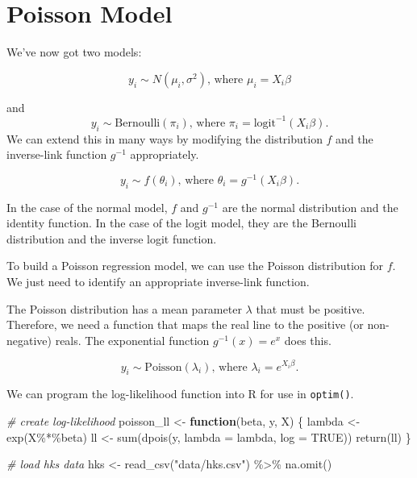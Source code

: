 \documentclass[
]{book}
\newenvironment{Shaded}{\begin{snugshade}}{\end{snugshade}}
\newcommand{\AttributeTok}[1]{\textcolor[rgb]{0.77,0.63,0.00}{#1}}
\newcommand{\CommentTok}[1]{\textcolor[rgb]{0.56,0.35,0.01}{\textit{#1}}}
\newcommand{\ConstantTok}[1]{\textcolor[rgb]{0.00,0.00,0.00}{#1}}
\newcommand{\ControlFlowTok}[1]{\textcolor[rgb]{0.13,0.29,0.53}{\textbf{#1}}}
\newcommand{\FunctionTok}[1]{\textcolor[rgb]{0.00,0.00,0.00}{#1}}
\newcommand{\NormalTok}[1]{#1}
\newcommand{\OtherTok}[1]{\textcolor[rgb]{0.56,0.35,0.01}{#1}}
\newcommand{\SpecialCharTok}[1]{\textcolor[rgb]{0.00,0.00,0.00}{#1}}
\newcommand{\StringTok}[1]{\textcolor[rgb]{0.31,0.60,0.02}{#1}}
\begin{document}
\hypertarget{poisson-model}{%
\section{Poisson Model}\label{poisson-model}}

We've now got two models:

\[
y_i \sim N(\mu_i, \sigma^2)\text{, where } \mu_i = X_i\beta
\]

and
\[
y_i \sim \text{Bernoulli}(\pi_i)\text{, where } \pi_i = \text{logit}^{-1}(X_i\beta).
\]
We can extend this in many ways by modifying the distribution \(f\) and the inverse-link function \(g^{-1}\) appropriately.

\[
y_i \sim f(\theta_i)\text{, where } \theta_i = g^{-1}(X_i\beta).
\]

In the case of the normal model, \(f\) and \(g^{-1}\) are the normal distribution and the identity function. In the case of the logit model, they are the Bernoulli distribution and the inverse logit function.

To build a Poisson regression model, we can use the Poisson distribution for \(f\). We just need to identify an appropriate inverse-link function.

The Poisson distribution has a mean parameter \(\lambda\) that must be positive. Therefore, we need a function that maps the real line to the positive (or non-negative) reals. The exponential function \(g^{-1}(x) = e^x\) does this.

\[
y_i \sim \text{Poisson}(\lambda_i)\text{, where } \lambda_i = e^{X_i\beta}.
\]

We can program the log-likelihood function into R for use in \texttt{optim()}.

\begin{Shaded}
\begin{Highlighting}[]
\CommentTok{\# create log{-}likelihood}
\NormalTok{poisson\_ll }\OtherTok{\textless{}{-}} \ControlFlowTok{function}\NormalTok{(beta, y, X) \{}
\NormalTok{  lambda }\OtherTok{\textless{}{-}} \FunctionTok{exp}\NormalTok{(X}\SpecialCharTok{\%*\%}\NormalTok{beta)}
\NormalTok{  ll }\OtherTok{\textless{}{-}} \FunctionTok{sum}\NormalTok{(}\FunctionTok{dpois}\NormalTok{(y, }\AttributeTok{lambda =}\NormalTok{ lambda, }\AttributeTok{log =} \ConstantTok{TRUE}\NormalTok{))}
  \FunctionTok{return}\NormalTok{(ll)}
\NormalTok{\}}

\CommentTok{\# load hks data}
\NormalTok{hks }\OtherTok{\textless{}{-}} \FunctionTok{read\_csv}\NormalTok{(}\StringTok{"data/hks.csv"}\NormalTok{) }\SpecialCharTok{\%\textgreater{}\%}
  \FunctionTok{na.omit}\NormalTok{()}
\end{Highlighting}
\end{Shaded}
\end{document}
